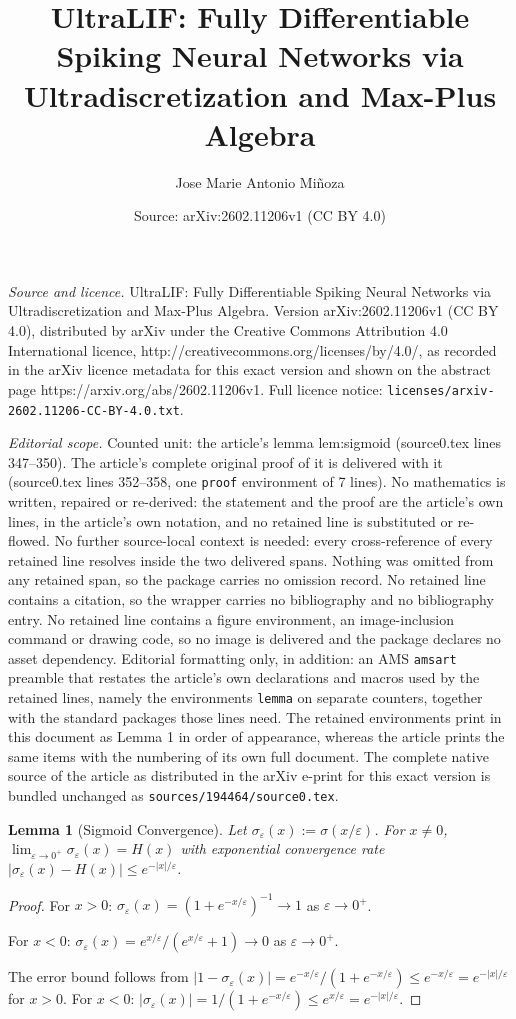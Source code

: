 \documentclass[10pt,a4paper]{amsart}
\title{UltraLIF: Fully Differentiable Spiking Neural Networks via Ultradiscretization and Max-Plus Algebra}
\author{Jose Marie Antonio Mi\~noza}
\date{Source: arXiv:2602.11206v1 (CC BY 4.0)}
\newtheorem{lemma}{Lemma}
\newcommand{\eps}{\varepsilon}
\begin{document}
\maketitle

\noindent\emph{Source and licence.} UltraLIF: Fully Differentiable Spiking Neural Networks via Ultradiscretization and Max-Plus Algebra. Version arXiv:2602.11206v1 (CC BY 4.0), distributed by arXiv under the Creative Commons Attribution 4.0 International licence, http://creativecommons.org/licenses/by/4.0/, as recorded in the arXiv licence metadata for this exact version and shown on the abstract page https://arxiv.org/abs/2602.11206v1. Full licence notice: \texttt{licenses/arxiv-2602.11206-CC-BY-4.0.txt}.\par\smallskip

\noindent\textit{Editorial scope.} Counted unit: the article's lemma lem:sigmoid (source0.tex lines 347--350). The article's complete original proof of it is delivered with it (source0.tex lines 352--358, one \texttt{proof} environment of 7 lines). No mathematics is written, repaired or re-derived: the statement and the proof are the article's own lines, in the article's own notation, and no retained line is substituted or re-flowed.  No further source-local context is needed: every cross-reference of every retained line resolves inside the two delivered spans.  Nothing was omitted from any retained span, so the package carries no omission record.  No retained line contains a citation, so the wrapper carries no bibliography and no bibliography entry.  No retained line contains a figure environment, an image-inclusion command or drawing code, so no image is delivered and the package declares no asset dependency.  Editorial formatting only, in addition: an AMS \texttt{amsart} preamble that restates the article's own declarations and macros used by the retained lines, namely the environments \texttt{lemma} on separate counters, together with the standard packages those lines need.  The retained environments print in this document as Lemma 1 in order of appearance, whereas the article prints the same items with the numbering of its own full document.  The complete native source of the article as distributed in the arXiv e-print for this exact version is bundled unchanged as \texttt{sources/194464/source0.tex}.
\begin{lemma}[Sigmoid Convergence]
\label{lem:sigmoid}
Let $\sigma_\eps(x) := \sigma(x/\eps)$. For $x \neq 0$, $\lim_{\eps \to 0^+} \sigma_\eps(x) = H(x)$ with exponential convergence rate $|\sigma_\eps(x) - H(x)| \leq e^{-|x|/\eps}$.
\end{lemma}

\begin{proof}
For $x > 0$: $\sigma_\eps(x) = (1 + e^{-x/\eps})^{-1} \to 1$ as $\eps \to 0^+$.

For $x < 0$: $\sigma_\eps(x) = e^{x/\eps}/(e^{x/\eps} + 1) \to 0$ as $\eps \to 0^+$.

The error bound follows from $|1 - \sigma_\eps(x)| = e^{-x/\eps}/(1 + e^{-x/\eps}) \leq e^{-x/\eps} = e^{-|x|/\eps}$ for $x > 0$. For $x < 0$: $|\sigma_\eps(x)| = 1/(1 + e^{-x/\eps}) \leq e^{x/\eps} = e^{-|x|/\eps}$.
\end{proof}
\end{document}
